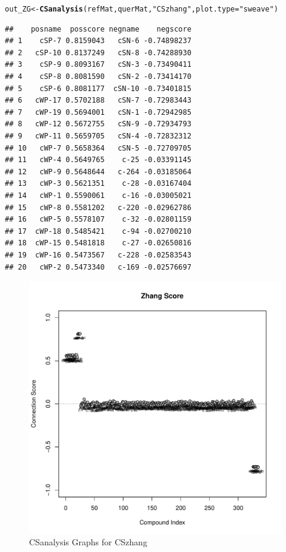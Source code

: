 \documentclass[a4paper]{article}\usepackage[]{graphicx}\usepackage[]{color}
\makeatletter
\newcommand{\hlstr}[1]{\textcolor[rgb]{0.192,0.494,0.8}{#1}}%
\newcommand{\hlstd}[1]{\textcolor[rgb]{0.345,0.345,0.345}{#1}}%
\newcommand{\hlkwb}[1]{\textcolor[rgb]{0.69,0.353,0.396}{#1}}%
\newcommand{\hlkwc}[1]{\textcolor[rgb]{0.333,0.667,0.333}{#1}}%
\newcommand{\hlkwd}[1]{\textcolor[rgb]{0.737,0.353,0.396}{\textbf{#1}}}%
\newenvironment{kframe}{%
 \def\at@end@of@kframe{}%
 \ifinner\ifhmode%
  \def\at@end@of@kframe{\end{minipage}}%
  \begin{minipage}{\columnwidth}%
 \fi\fi%
 \def\FrameCommand##1{\hskip\@totalleftmargin \hskip-\fboxsep
 \colorbox{shadecolor}{##1}\hskip-\fboxsep
     \hskip-\linewidth \hskip-\@totalleftmargin \hskip\columnwidth}%
 \MakeFramed {\advance\hsize-\width
   \@totalleftmargin\z@ \linewidth\hsize
   \@setminipage}}%
 {\par\unskip\endMakeFramed%
 \at@end@of@kframe}
\newenvironment{knitrout}{}{} %
\makeatother
\begin{document}
\begin{knitrout}
\color{fgcolor}\begin{kframe}
\begin{alltt}
        \hlstd{out_ZG} \hlkwb{<-} \hlkwd{CSanalysis}\hlstd{(refMat,querMat,}\hlstr{"CSzhang"}\hlstd{,}\hlkwc{plot.type}\hlstd{=}\hlstr{"sweave"}\hlstd{)}
\end{alltt}
\begin{verbatim}
##    posname  posscore negname    negscore
## 1    cSP-7 0.8159043   cSN-6 -0.74898237
## 2   cSP-10 0.8137249   cSN-8 -0.74288930
## 3    cSP-9 0.8093167   cSN-3 -0.73490411
## 4    cSP-8 0.8081590   cSN-2 -0.73414170
## 5    cSP-6 0.8081177  cSN-10 -0.73401815
## 6   cWP-17 0.5702188   cSN-7 -0.72983443
## 7   cWP-19 0.5694001   cSN-1 -0.72942985
## 8   cWP-12 0.5672755   cSN-9 -0.72934793
## 9   cWP-11 0.5659705   cSN-4 -0.72832312
## 10   cWP-7 0.5658364   cSN-5 -0.72709705
## 11   cWP-4 0.5649765    c-25 -0.03391145
## 12   cWP-9 0.5648644   c-264 -0.03185064
## 13   cWP-3 0.5621351    c-28 -0.03167404
## 14   cWP-1 0.5590061    c-16 -0.03005021
## 15   cWP-8 0.5581202   c-220 -0.02962786
## 16   cWP-5 0.5578107    c-32 -0.02801159
## 17  cWP-18 0.5485421    c-94 -0.02700210
## 18  cWP-15 0.5481818    c-27 -0.02650816
## 19  cWP-16 0.5473567   c-228 -0.02583543
## 20   cWP-2 0.5473340   c-169 -0.02576697
\end{verbatim}
\end{kframe}\begin{figure}[H]


{\centering \includegraphics[width=11cm]{figure/ZG-1} 

}

\caption[CSanalysis Graphs for CSzhang]{CSanalysis Graphs for CSzhang\label{fig:ZG}}
\end{figure}


\end{knitrout}
\end{document}
